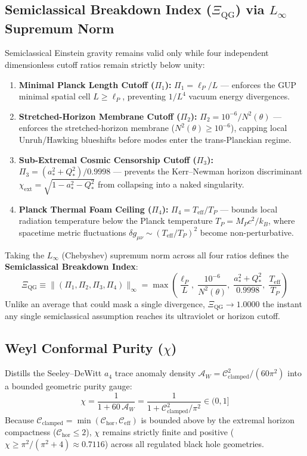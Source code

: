 \documentclass[11pt,a4paper]{article}
\begin{document}
\subsection{Semiclassical Breakdown Index ($\Xi_{\text{QG}}$) via $L_\infty$ Supremum Norm}
Semiclassical Einstein gravity remains valid only while four independent dimensionless cutoff ratios remain strictly below unity:
\begin{enumerate}[leftmargin=1.5em]
    \item \textbf{Minimal Planck Length Cutoff ($\Pi_1$):} $\Pi_1 = \ell_P / L$ --- enforces the GUP minimal spatial cell $L \ge \ell_P$, preventing $1/L^4$ vacuum energy divergences.
    \item \textbf{Stretched-Horizon Membrane Cutoff ($\Pi_2$):} $\Pi_2 = 10^{-6} / N^2(\theta)$ --- enforces the stretched-horizon membrane ($N^2(\theta) \ge 10^{-6}$), capping local Unruh/Hawking blueshifts before modes enter the trans-Planckian regime.
    \item \textbf{Sub-Extremal Cosmic Censorship Cutoff ($\Pi_3$):} $\Pi_3 = (a_*^2 + Q_*^2) / 0.9998$ --- prevents the Kerr--Newman horizon discriminant $\chi_{\text{ext}} = \sqrt{1 - a_*^2 - Q_*^2}$ from collapsing into a naked singularity.
    \item \textbf{Planck Thermal Foam Ceiling ($\Pi_4$):} $\Pi_4 = T_{\text{eff}} / T_P$ --- bounds local radiation temperature below the Planck temperature $T_P = M_P c^2 / k_B$, where spacetime metric fluctuations $\delta g_{\mu\nu} \sim (T_{\text{eff}}/T_P)^2$ become non-perturbative.
\end{enumerate}

Taking the $L_\infty$ (Chebyshev) supremum norm across all four ratios defines the \textbf{Semiclassical Breakdown Index}:
\begin{equation}
\Xi_{\text{QG}} \equiv \big\| (\Pi_1, \Pi_2, \Pi_3, \Pi_4) \big\|_\infty = \max\left(\frac{\ell_P}{L},\; \frac{10^{-6}}{N^2(\theta)},\; \frac{a_*^2 + Q_*^2}{0.9998},\; \frac{T_{\text{eff}}}{T_P}\right)
\end{equation}
Unlike an average that could mask a single divergence, $\Xi_{\text{QG}} \to 1.0000$ the instant any single semiclassical assumption reaches its ultraviolet or horizon cutoff.

\subsection{Weyl Conformal Purity ($\chi$)}
Distills the Seeley--DeWitt $a_4$ trace anomaly density $\mathcal{A}_W = \mathcal{C}_{\text{clamped}}^2 / (60\pi^2)$ into a bounded geometric purity gauge:
\begin{equation}
\chi = \frac{1}{1 + 60\,\mathcal{A}_W} = \frac{1}{1 + \mathcal{C}_{\text{clamped}}^2 / \pi^2} \in (0, 1]
\end{equation}
Because $\mathcal{C}_{\text{clamped}} = \min(\mathcal{C}_{\text{hor}}, \mathcal{C}_{\text{eff}})$ is bounded above by the extremal horizon compactness ($\mathcal{C}_{\text{hor}} \le 2$), $\chi$ remains strictly finite and positive ($\chi \ge \pi^2 / (\pi^2 + 4) \approx 0.7116$) across all regulated black hole geometries.
\end{document}
